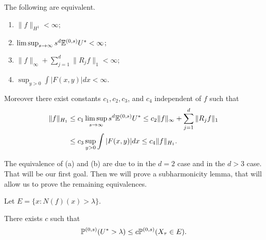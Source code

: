 \begin{theorem}\label{thm:ch4_6.2}
The following are equivalent.
\begin{enumerate}
    \item $\|f\|_{H^1} < \infty$;
    \item $\limsup_{s\to\infty} s^d \E^{(0,s)}U^*<\infty$;
    \item $\|f\|_\infty +\sum_{j=1}^d \|R_j f\|_1<\infty$;
    \item $\sup_{y>0} \int |F(x,y)|dx<\infty$.
\end{enumerate}
Moreover there exist constants $c_1,c_2,c_3$, and $c_4$ independent of $f$ such that
\begin{align*}
    \|f\|_{H_1}&\leq c_1\limsup_{s\to\infty}s^d \E^{(0,s)}U^* \le c_2\|f\|_\infty +\sum_{j=1}^d \|R_j f\|_1 \\
    &\leq c_3 \sup_{y>0} \int |F(x,y)|dx \le c_4\|f\|_{H_1}.
\end{align*}
\end{theorem}


The equivalence of (a) and (b) are due to \cite{BurkholderGundySilverstein1971} in the $d = 2$ case and \cite{BurkholderGundy1973} in the $d > 3$ case. That will be our first goal. Then we will prove a subharmonicity lemma, that will allow us to prove the remaining equivalences.

Let $E=\{x:N(f)(x)>\lambda\}$.

\begin{proposition}\label{prop:ch4_6.3}
There exists $c$ such that
\[
    \P^{(0,s)}(U^* > \lambda) \leq c\P^{(0,s)}(X_\tau \in E).
\]
\end{proposition}

